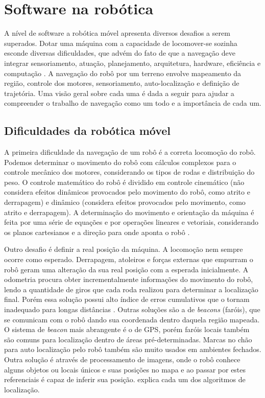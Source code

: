 \section{Software na robótica}

A nível de software a robótica móvel apresenta diversos desafios a serem superados. Dotar uma máquina com a capacidade de locomover-se sozinha esconde diversas dificuldades, que advém do fato de que a navegação deve integrar sensoriamento, atuação, planejamento, arquitetura, hardware, eficiência e computação \cite{Souza2008}. A navegação do robô por um terreno envolve mapeamento da região, controle dos motores, sensoriamento, auto-localização e definição de trajetória. Uma visão geral sobre cada uma é dada a seguir para ajudar a compreender o trabalho de navegação como um todo e a importância de cada um.

\subsection{Dificuldades da robótica móvel}

A primeira dificuldade da navegação de um robô é a correta locomoção do robô. Podemos determinar o movimento do robô com cálculos complexos para o controle mecânico dos motores, considerando os tipos de rodas e distribuição do peso. O controle matemático do robô é dividido em controle cinemático (não considera efeitos dinâmicos provocados pelo movimento do robô, como atrito e derrapagem) e dinâmico (considera efeitos provocados pelo movimento, como atrito e derrapagem). A determinação do movimento e orientação da máquina é feita por uma série de equações e por operações lineares e vetoriais, considerando os planos cartesianos e a direção para onde aponta o robô \cite{Siegwart2004}.

Outro desafio é definir a real posição da máquina. A locomoção nem sempre ocorre como esperado. Derrapagem, atoleiros e forças externas que empurram o robô geram uma alteração da sua real posição com a esperada inicialmente. A odometria procura obter incrementalmente informações do movimento do robô, lendo a quantidade de giros que cada roda realizou para determinar a localização final. Porém essa solução possui alto índice de erros cumulativos que o tornam inadequado para longas distâncias \cite{Pereira2003}. Outras soluções são a de \textit{beacons} (faróis), que se comunicam com o robô dando sua coordenada dentro daquela região mapeada. O sistema de \textit{beacon} mais abrangente é o de GPS, porém faróis locais também são comuns para localização dentro de áreas pré-determinadas. Marcas no chão para auto localização pelo robô também são muito usados em ambientes fechados. Outra solução é através de processamento de imagens, onde o robô conhece alguns objetos ou locais únicos e suas posições no mapa e ao passar por estes referenciais é capaz de inferir sua posição. \cite{Borenstein1996} explica cada um dos algoritmos de localização.

